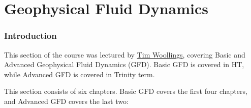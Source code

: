 \part{Geophysical Fluid Dynamics}\label{Geophysical Fluid Dynamics}

\section*{Introduction}

This section of the course was lectured by \href{https://www.physics.ox.ac.uk/our-people/woollings}{Tim Woollings}, covering Basic and Advanced Geophysical Fluid Dynamics (GFD). Basic GFD is covered in HT, while Advanced GFD is covered in Trinity term.\vspace{5 mm}

\noindent This section consists of six chapters. Basic GFD covers the first four chapters, and Advanced GFD covers the last two:\vspace{5 mm}

